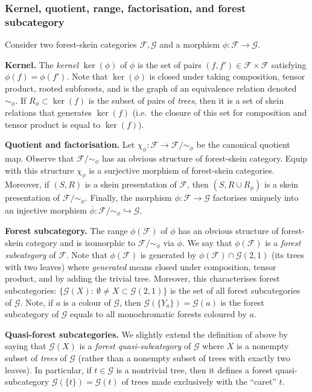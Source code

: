 \documentclass[a4paper, 12pt]{amsart}
\numberwithin{equation}{section}
\theoremstyle{definition}
\newcommand{\cF}{\mathcal F}
\newcommand{\cG}{\mathcal G}
\newcommand{\into}{\hookrightarrow}
\newcommand{\ov}{\overline}
\begin{document}
\subsubsection{Kernel, quotient, range, factorisation, and forest subcategory}\label{sec:forest-sub}
Consider two forest-skein categories $\cF,\cG$ and a morphism $\phi:\cF\to\cG$.

{\bf Kernel.}
The \textit{kernel} $\ker(\phi)$ of $\phi$ is the set of pairs $(f,f')\in\cF\times \cF$ satisfying $\phi(f)=\phi(f').$
Note that $\ker(\phi)$ is closed under taking composition, tensor product, rooted subforests, and is the graph of an equivalence relation denoted $\sim_\phi.$
If $R_\phi\subset\ker(f)$ is the subset of pairs of {\it trees}, then it is a set of skein relations that generates $\ker(f)$ (i.e.~the closure of this set for composition and tensor product is equal to $\ker(f)$).

{\bf Quotient and factorisation.}
Let $\chi_\phi:\cF\to \cF/\sim_\phi$ be the canonical quotient map.
Observe that $\cF/\sim_\phi$ has an obvious structure of forest-skein category. 
Equip with this structure $\chi_\phi$ is a surjective morphism of forest-skein categories.
Moreover, if $(S,R)$ is a skein presentation of $\cF$, then $(S,R\cup R_\phi)$ is a skein presentation of $\cF/\sim_\phi$.
Finally, the morphism $\phi:\cF\to\cG$ factorises uniquely into an injective morphism $\ov\phi:\cF/\sim_\phi\into\cG$.

{\bf Forest subcategory.}
The range $\phi(\cF)$ of $\phi$ has an obvious structure of forest-skein category and is isomorphic to $\cF/\sim_\phi$ via $\ov\phi$.
We say that $\phi(\cF)$ is a {\it forest subcategory} of $\cF$.
Note that $\phi(\cF)$ is generated by $\phi(\cF)\cap \cG(2,1)$ (its trees with two leaves) where {\it generated} means closed under composition, tensor product, and by adding the trivial tree.
Moreover, this characterises forest subcategories: $\{\cG(X):\ \emptyset\neq X\subset\cG(2,1)\}$ is the set of all forest subcategories of $\cG$.
Note, if $a$ is a colour of $\cG$, then $\cG(\{Y_a\})=\cG(a)$ is the forest subcategory of $\cG$ equals to all monochromatic forests coloured by $a$. 

{\bf Quasi-forest subcategories.}
We slightly extend the definition of above by saying that $\cG(X)$ is a {\it forest quasi-subcategory} of $\cG$ where $X$ is a nonempty subset of {\it trees} of $\cG$ (rather than a nonempty subset of trees with exactly two leaves).
In particular, if $t\in\cG$ is a nontrivial tree, then it defines a forest quasi-subcategory $\cG(\{t\})=\cG(t)$ of trees made exclusively with the ``caret'' $t$.
\end{document}
